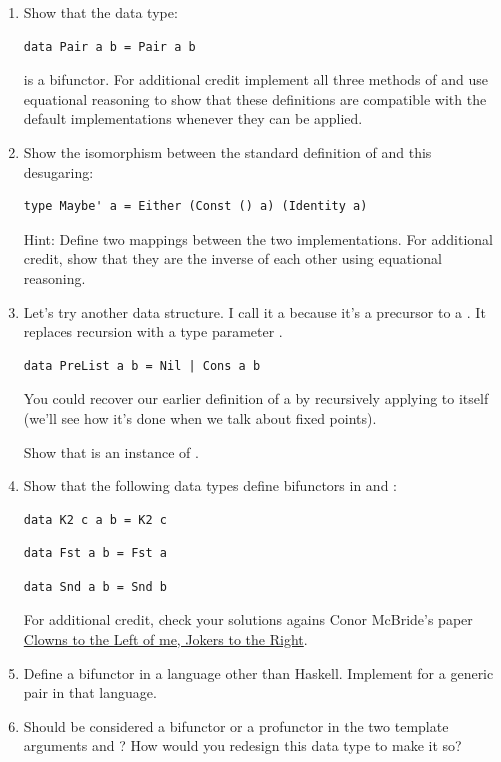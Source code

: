 \begin{enumerate}
\tightlist
\item
  Show that the data type:

\begin{verbatim}
data Pair a b = Pair a b
\end{verbatim}

  is a bifunctor. For additional credit implement all three methods of
   and use equational reasoning to show that these
  definitions are compatible with the default implementations whenever
  they can be applied.
\item
  Show the isomorphism between the standard definition of 
  and this desugaring:

\begin{verbatim}
type Maybe' a = Either (Const () a) (Identity a)
\end{verbatim}

  Hint: Define two mappings between the two implementations. For
  additional credit, show that they are the inverse of each other using
  equational reasoning.
\item
  Let's try another data structure. I call it a  because
  it's a precursor to a . It replaces recursion with a type
  parameter .

\begin{verbatim}
data PreList a b = Nil | Cons a b
\end{verbatim}

  You could recover our earlier definition of a  by
  recursively applying  to itself (we'll see how it's
  done when we talk about fixed points).

  Show that  is an instance of .
\item
  Show that the following data types define bifunctors in  and
  :

\begin{verbatim}
data K2 c a b = K2 c
\end{verbatim}

\begin{verbatim}
data Fst a b = Fst a
\end{verbatim}

\begin{verbatim}
data Snd a b = Snd b
\end{verbatim}

  For additional credit, check your solutions agains Conor McBride's
  paper \href{http://strictlypositive.org/CJ.pdf}{Clowns to the Left of
  me, Jokers to the Right}.
\item
  Define a bifunctor in a language other than Haskell. Implement
   for a generic pair in that language.
\item
  Should  be considered a bifunctor or a profunctor in
  the two template arguments  and ? How would you
  redesign this data type to make it so?
\end{enumerate}